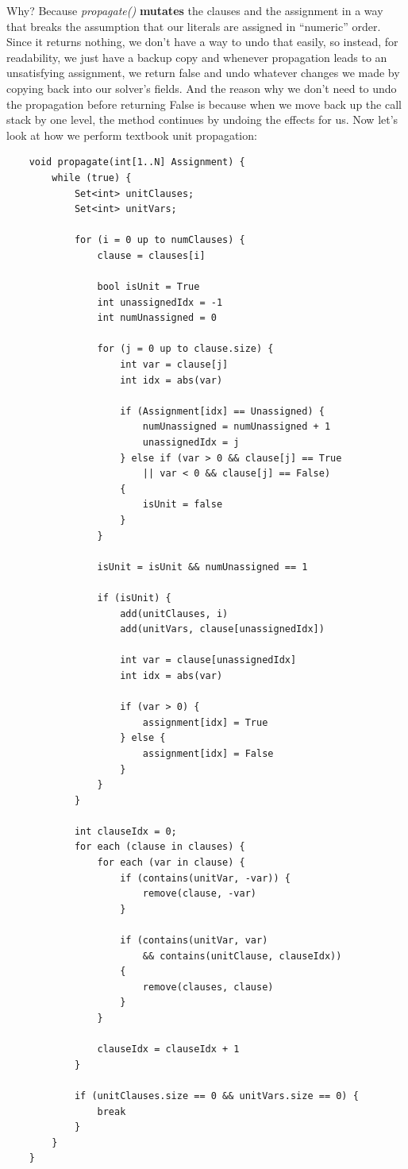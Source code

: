 \documentclass[../main.tex]{subfiles}
\begin{document}
Why? Because \textit{propagate()} \textbf{mutates} the clauses and the assignment in a way 
that breaks the assumption that our literals are assigned in ``numeric'' order. Since it 
returns nothing, we don't have a way to undo that easily, so instead, for readability, 
we just have a backup copy and whenever propagation leads to an unsatisfying assignment, 
we return false and undo whatever changes we made by copying back into our solver's fields.
And the reason why we don't need to undo the propagation before returning False is because 
when we move back up the call stack by one level, the method continues by undoing the effects for us.
Now let's look at how we perform textbook unit propagation:

\begin{lstlisting}
    void propagate(int[1..N] Assignment) {
        while (true) {
            Set<int> unitClauses;
            Set<int> unitVars;

            for (i = 0 up to numClauses) {
                clause = clauses[i]

                bool isUnit = True
                int unassignedIdx = -1
                int numUnassigned = 0

                for (j = 0 up to clause.size) {
                    int var = clause[j]
                    int idx = abs(var)

                    if (Assignment[idx] == Unassigned) {
                        numUnassigned = numUnassigned + 1
                        unassignedIdx = j
                    } else if (var > 0 && clause[j] == True 
                        || var < 0 && clause[j] == False)
                    {
                        isUnit = false
                    }
                }

                isUnit = isUnit && numUnassigned == 1

                if (isUnit) {
                    add(unitClauses, i)
                    add(unitVars, clause[unassignedIdx])

                    int var = clause[unassignedIdx]
                    int idx = abs(var)

                    if (var > 0) {
                        assignment[idx] = True
                    } else {
                        assignment[idx] = False
                    }
                }
            }

            int clauseIdx = 0;
            for each (clause in clauses) {
                for each (var in clause) {
                    if (contains(unitVar, -var)) {
                        remove(clause, -var)
                    }

                    if (contains(unitVar, var) 
                        && contains(unitClause, clauseIdx))
                    {
                        remove(clauses, clause)
                    }
                }

                clauseIdx = clauseIdx + 1
            }

            if (unitClauses.size == 0 && unitVars.size == 0) {
                break
            }
        }
    }
\end{lstlisting}
\end{document}
